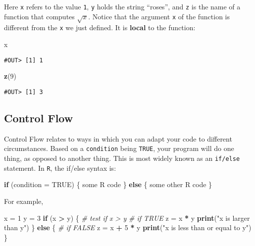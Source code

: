 \documentclass[]{book}
\newenvironment{Shaded}{\begin{snugshade}}{\end{snugshade}}
\newcommand{\KeywordTok}[1]{\textcolor[rgb]{0.13,0.29,0.53}{\textbf{#1}}}
\newcommand{\DataTypeTok}[1]{\textcolor[rgb]{0.13,0.29,0.53}{#1}}
\newcommand{\DecValTok}[1]{\textcolor[rgb]{0.00,0.00,0.81}{#1}}
\newcommand{\StringTok}[1]{\textcolor[rgb]{0.31,0.60,0.02}{#1}}
\newcommand{\CommentTok}[1]{\textcolor[rgb]{0.56,0.35,0.01}{\textit{#1}}}
\newcommand{\OtherTok}[1]{\textcolor[rgb]{0.56,0.35,0.01}{#1}}
\newcommand{\ControlFlowTok}[1]{\textcolor[rgb]{0.13,0.29,0.53}{\textbf{#1}}}
\newcommand{\OperatorTok}[1]{\textcolor[rgb]{0.81,0.36,0.00}{\textbf{#1}}}
\newcommand{\NormalTok}[1]{#1}
\begin{document}
Here \texttt{x} refers to the value \texttt{1}, \texttt{y} holds the
string ``roses'', and \texttt{z} is the name of a function that computes
\(\sqrt{x}\). Notice that the argument \texttt{x} of the function is
different from the \texttt{x} we just defined. It is \textbf{local} to
the function:

\begin{Shaded}
\begin{Highlighting}[]
\NormalTok{x}
\end{Highlighting}
\end{Shaded}

\begin{verbatim}
#OUT> [1] 1
\end{verbatim}

\begin{Shaded}
\begin{Highlighting}[]
\KeywordTok{z}\NormalTok{(}\DecValTok{9}\NormalTok{)}
\end{Highlighting}
\end{Shaded}

\begin{verbatim}
#OUT> [1] 3
\end{verbatim}

\subsection{Control Flow}\label{control-flow}

Control Flow relates to ways in which you can adapt your code to
different circumstances. Based on a \texttt{condition} being
\texttt{TRUE}, your program will do one thing, as opposed to another
thing. This is most widely known as an \texttt{if/else} statement. In
\texttt{R}, the if/else syntax is:

\begin{Shaded}
\begin{Highlighting}[]
\ControlFlowTok{if}\NormalTok{ (}\DataTypeTok{condition =} \OtherTok{TRUE}\NormalTok{) \{}
\NormalTok{  some R code}
\NormalTok{\} }\ControlFlowTok{else}\NormalTok{ \{}
\NormalTok{  some other R code}
\NormalTok{\}}
\end{Highlighting}
\end{Shaded}

For example,

\begin{Shaded}
\begin{Highlighting}[]
\NormalTok{x =}\StringTok{ }\DecValTok{1}
\NormalTok{y =}\StringTok{ }\DecValTok{3}
\ControlFlowTok{if}\NormalTok{ (x }\OperatorTok{>}\StringTok{ }\NormalTok{y) \{  }\CommentTok{# test if x > y}
  \CommentTok{# if TRUE}
\NormalTok{  z =}\StringTok{ }\NormalTok{x }\OperatorTok{*}\StringTok{ }\NormalTok{y}
  \KeywordTok{print}\NormalTok{(}\StringTok{"x is larger than y"}\NormalTok{)}
\NormalTok{\} }\ControlFlowTok{else}\NormalTok{ \{}
  \CommentTok{# if FALSE}
\NormalTok{  z =}\StringTok{ }\NormalTok{x }\OperatorTok{+}\StringTok{ }\DecValTok{5} \OperatorTok{*}\StringTok{ }\NormalTok{y}
  \KeywordTok{print}\NormalTok{(}\StringTok{"x is less than or equal to y"}\NormalTok{)}
\NormalTok{\}}
\end{Highlighting}
\end{Shaded}
\end{document}
